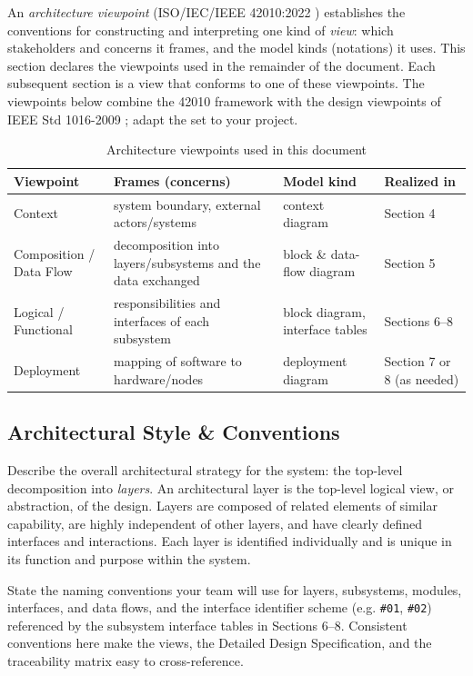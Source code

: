 An \textit{architecture viewpoint} (ISO/IEC/IEEE 42010:2022 \cite{ISO42010}) establishes the conventions for constructing and interpreting one kind of \textit{view}: which stakeholders and concerns it frames, and the model kinds (notations) it uses. This section declares the viewpoints used in the remainder of the document. Each subsequent section is a view that conforms to one of these viewpoints. The viewpoints below combine the 42010 framework with the design viewpoints of IEEE Std 1016-2009 \cite{IEEE1016}; adapt the set to your project.

\begin{table}[H]
\caption{Architecture viewpoints used in this document}
\begin{center}
    \begin{tabular}{ | p{3cm} | p{5cm} | p{2.5cm} | p{2.5cm} |}
    \hline
    \textbf{Viewpoint} & \textbf{Frames (concerns)} & \textbf{Model kind} & \textbf{Realized in} \\ \hline
    Context & system boundary, external actors/systems & context diagram & Section 4 \\ \hline
    Composition / Data Flow & decomposition into layers/subsystems and the data exchanged & block \& data-flow diagram & Section 5 \\ \hline
    Logical / Functional & responsibilities and interfaces of each subsystem & block diagram, interface tables & Sections 6--8 \\ \hline
    Deployment & mapping of software to hardware/nodes & deployment diagram & Section 7 or 8 (as needed) \\ \hline
    \end{tabular}
\end{center}
\end{table}

\subsection{Architectural Style \& Conventions}
Describe the overall architectural strategy for the system: the top-level decomposition into \textit{layers}. An architectural layer is the top-level logical view, or abstraction, of the design. Layers are composed of related elements of similar capability, are highly independent of other layers, and have clearly defined interfaces and interactions. Each layer is identified individually and is unique in its function and purpose within the system.

State the naming conventions your team will use for layers, subsystems, modules, interfaces, and data flows, and the interface identifier scheme (e.g. \texttt{\#01}, \texttt{\#02}) referenced by the subsystem interface tables in Sections 6--8. Consistent conventions here make the views, the Detailed Design Specification, and the traceability matrix easy to cross-reference.
